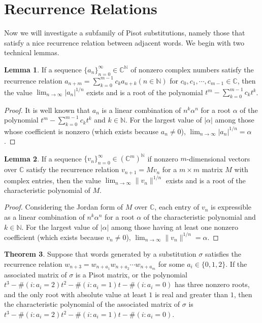 \documentclass{article}
\theoremstyle{definition}
\newtheorem{theorem}{Theorem}
\newtheorem{lemma}[theorem]{Lemma}
\begin{document}
\section{Recurrence Relations}
Now we will investigate a subfamily of Pisot substitutions, namely those that satisfy a nice recurrence relation between adjacent words. We begin with two technical lemmas.
\begin{lemma}
\label{l5-1}
If a sequence $\{a_n\}_{n=0}^\infty\in\mathbb{C}^\mathbb{N}$ of nonzero complex numbers satisfy the recurrence relation $a_{n+m}=\sum_{k=0}^{m-1}c_ka_{n+k}(n\in\mathbb{N})$ for $c_0, c_1, \cdots, c_{m-1}\in\mathbb{C}$, then the value $\lim_{n\rightarrow\infty}|a_n|^{1/n}$ exists and is a root of the polynomial $t^m-\sum_{k=0}^{m-1}c_kt^{k}$.
\end{lemma}
\begin{proof}
It is well known that $a_n$ is a linear combination of $n^k\alpha^n$ for a root $\alpha$ of the polynomial $t^m-\sum_{k=0}^{m-1}c_kt^{k}$ and $k\in\mathbb{N}$. For the largest value of $|\alpha|$ among those whose coefficient is nonzero (which exists because $a_n\neq0$), $\lim_{n\rightarrow\infty}|a_n|^{1/n}=\alpha$.
\end{proof}
\begin{lemma}
\label{l5-2}
If a sequence $\{v_n\}_{n=0}^\infty\in (\mathbb{C}^m)^\mathbb{N}$ if nonzero $m$-dimensional vectors over $\mathbb{C}$ satisfy the recurrence relation $v_{n+1}=Mv_n$ for a $m\times m$ matrix $M$ with complex entries, then the value $\lim_{n\rightarrow\infty}\|v_n \|^{1/n}$ exists and is a root of the characteristic polynomial of $M$.
\end{lemma}
\begin{proof}
Considering the Jordan form of $M$ over $\mathbb{C}$, each entry of $v_n$ is expressible as a linear combination of $n^k\alpha^n$ for a root $\alpha$ of the characteristic polynomial and $k\in\mathbb{N}$. For the largest value of $|\alpha|$ among those having at least one nonzero coefficient (which exists because $v_n\neq0$), $\lim_{n\rightarrow\infty}\|v_n\|^{1/n}=\alpha$.
\end{proof}
\begin{theorem}
\label{t5-1}
Suppose that words generated by a substitution $\sigma$ satisfies the recurrence relation $w_{n+3}=w_{n+a_1}w_{n+a_2}\cdots w_{n+a_m}$ for some $a_i\in\{0, 1, 2\}$. If the associated matrix of $\sigma$ is a Pisot matrix, or the polynomial $t^3- \#(i:a_i=2)t^2-\#(i:a_i=1)t-\#(i:a_i=0)$ has three nonzero roots, and the only root with absolute value at least $1$ is real and greater than $1$, then the characteristic polynomial of the associated matrix of $\sigma$ is $ t^3- \#(i:a_i=2)t^2-\#(i:a_i=1)t-\#(i:a_i=0)$.
\end{theorem}
\end{document}
